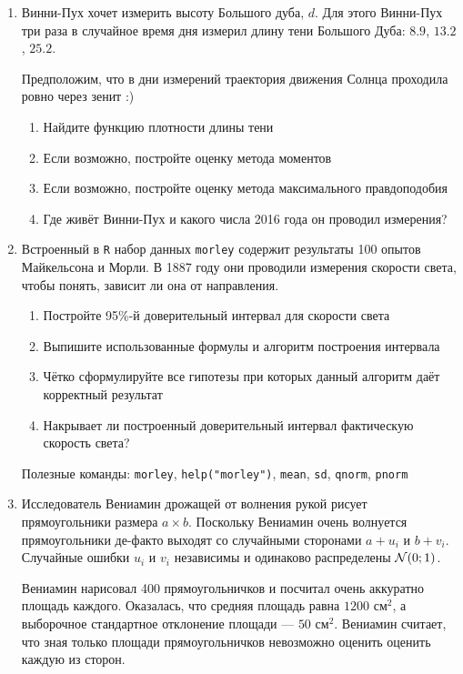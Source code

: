 \begin{enumerate}
\item Винни-Пух хочет измерить высоту Большого дуба, $d$. Для этого Винни-Пух три
раза в случайное время дня измерил длину тени Большого Дуба: $8.9$, $13.2$, $25.2$.

Предположим, что в дни измерений траектория движения Солнца проходила ровно через зенит :)

\begin{enumerate}
\item Найдите функцию плотности длины тени
\item Если возможно, постройте оценку метода моментов
\item Если возможно, постройте оценку метода максимального правдоподобия
\item Где живёт Винни-Пух и какого числа 2016 года он проводил измерения?
\end{enumerate}

\item Встроенный в \verb|R| набор данных \verb|morley| содержит результаты 100
опытов Майкельсона и Морли. В 1887 году они проводили измерения скорости света,
чтобы понять, зависит ли она от направления.

\begin{enumerate}
\item Постройте 95\%-й доверительный интервал для скорости света
\item Выпишите использованные формулы и алгоритм построения интервала
\item Чётко сформулируйте все гипотезы при которых данный алгоритм даёт корректный результат
\item Накрывает ли построенный доверительный интервал фактическую скорость света?
\end{enumerate}

Полезные команды: \verb|morley|, \verb|help("morley")|, \verb|mean|, \verb|sd|,
\verb|qnorm|, \verb|pnorm|

\item  Исследователь Вениамин дрожащей от волнения рукой рисует прямоугольники
размера $a\times b$. Поскольку Вениамин очень волнуется прямоугольники де-факто
выходят со случайными сторонами $a+u_i$ и $b+v_i$. Случайные ошибки $u_i$ и $v_i$
независимы и одинаково распределены $\mathcal{N}(0;1)$.

Вениамин нарисовал 400 прямоугольничков и посчитал очень аккуратно площадь каждого.
Оказалась, что средняя площадь равна $1200$ см$^2$, а выборочное стандартное
отклонение площади — $50$ см$^2$. Вениамин считает, что зная только площади
прямоугольничков невозможно оценить оценить каждую из сторон.


\end{enumerate}
